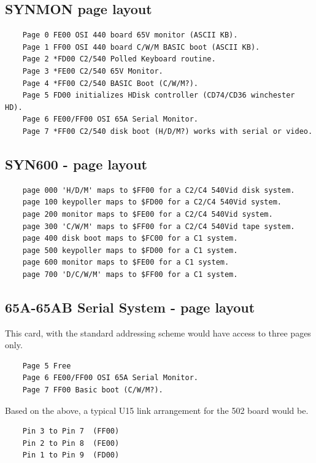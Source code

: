 \subsection{SYNMON page layout}

\begin{verbatim}
    Page 0 FE00 OSI 440 board 65V monitor (ASCII KB).
    Page 1 FF00 OSI 440 board C/W/M BASIC boot (ASCII KB).
    Page 2 *FD00 C2/540 Polled Keyboard routine.
    Page 3 *FE00 C2/540 65V Monitor.
    Page 4 *FF00 C2/540 BASIC Boot (C/W/M?).
    Page 5 FD00 initializes HDisk controller (CD74/CD36 winchester HD).
    Page 6 FE00/FF00 OSI 65A Serial Monitor.
    Page 7 *FF00 C2/540 disk boot (H/D/M?) works with serial or video.
\end{verbatim}

\subsection{SYN600 - page layout}

\begin{verbatim}
    page 000 'H/D/M' maps to $FF00 for a C2/C4 540Vid disk system.
    page 100 keypoller maps to $FD00 for a C2/C4 540Vid system.
    page 200 monitor maps to $FE00 for a C2/C4 540Vid system.
    page 300 'C/W/M' maps to $FF00 for a C2/C4 540Vid tape system.
    page 400 disk boot maps to $FC00 for a C1 system.
    page 500 keypoller maps to $FD00 for a C1 system.
    page 600 monitor maps to $FE00 for a C1 system.
    page 700 'D/C/W/M' maps to $FF00 for a C1 system.
\end{verbatim}

\subsection{65A-65AB Serial System - page layout}

This card, with the standard addressing scheme would have access to three pages only.

\begin{verbatim}
    Page 5 Free
    Page 6 FE00/FF00 OSI 65A Serial Monitor.
    Page 7 FF00 Basic boot (C/W/M?).
\end{verbatim}

Based on the above, a typical U15 link arrangement for the 502 board would be.

\begin{verbatim}
    Pin 3 to Pin 7  (FF00)
    Pin 2 to Pin 8  (FE00)
    Pin 1 to Pin 9  (FD00)
\end{verbatim}
